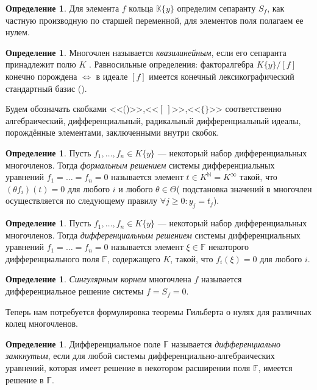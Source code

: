 \documentclass[16pt]{article}
\renewcommand{\ge}{\geqslant} %
\theoremstyle{plain}
\theoremstyle{definition}
\newtheorem{definition}[theorem]{Определение}
\theoremstyle{remark}
\begin{document}
\begin{definition}
Для элемента $f$ кольца $\mathbb{K}\{y\}$ определим сепаранту $S_f$,
как частную производную по старшей переменной, для элементов поля полагаем ее нулем.
\end{definition}

\begin{definition} Многочлен называется {\it квазилинейным}, если
его сепаранта принадлежит полю $K$ . Равносильные определения:
факторалгебра $K\{y\}/[f]$ конечно порождена $ \Leftrightarrow$ в
идеале $[f]$ имеется конечный лексикографический стандартный базис
(\cite[ теорема 2]{Ferro Theorem 2}).
\end{definition}



Будем обозначать скобками <<()>>,<<$[~]$>>,<<$\{\}$>> соответственно
алгебраический, дифференциальный, радикальный дифференциальный
идеалы, порождённые элементами, заключенными внутри скобок.


\begin{definition}
Пусть $f_1,\ldots,f_n\in K\{y\}$ --- некоторый набор
дифференциальных многочленов. Тогда  {\it формальным решением}
системы дифференциальных уравнений $f_1=\ldots =f_n=0$ называется
элемент $t\in K^{\mathbb{N}}= K^{\infty}$ такой, что $ (\theta f_i)(t)=0$ для
любого $i$ и любого $\theta\in\Theta$( подстановка значений в
многочлен осуществляется по следующему правилу $\forall j\ge 0:
y_j=t_j$).
\end{definition}


\begin{definition}
Пусть $f_1,\ldots,f_n\in K\{y\}$ --- некоторый
набор дифференциальных многочленов. Тогда  {\it дифференциальным
решением} системы дифференциальных уравнений $f_1=\ldots =f_n=0$
называется элемент $\xi \in \mathbb{F}$ некоторого дифференциального
поля $\mathbb{F}$, содержащего $K$, такой, что $ f_i(\xi)=0$ для
любого $i$.
\end{definition}

\begin{definition} {\it Сингулярным корнем} многочлена $f$
называется дифференциальное решение системы $f=S_f=0$.
\end{definition}


Теперь нам потребуется формулировка теоремы Гильберта о нулях для
различных колец многочленов.

\begin{definition} Дифференциальное поле $\mathbb{F}$ называется
{\it дифференциально замкнутым}, если для любой системы дифференциально-алгебраических
уравнений, которая имеет решение в некотором расширении поля $\mathbb{F}$,
имеется решение  в $\mathbb{F}$.
\end{definition}
\end{document}
